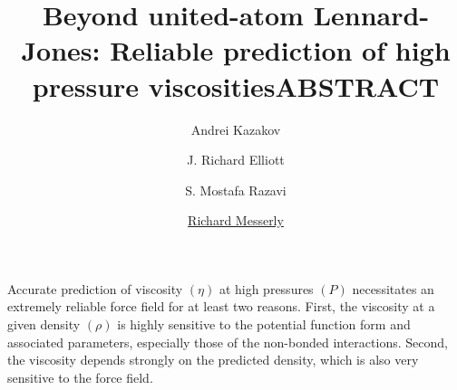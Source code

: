 \documentclass[11pt,a4paper]{article}
\begin{document}
	\thispagestyle{empty}
	\title{\Large \textbf{Beyond united-atom Lennard-Jones: Reliable prediction of high pressure viscosities}}
	\author[1]{\large {Andrei Kazakov}}
	\author[2]{\large {J. Richard Elliott}}
	\author[2]{\large {S. Mostafa Razavi}}
	\author[1]{\large {\underline{Richard Messerly}}}%

	
	
	\date{} %
	\maketitle\thispagestyle{empty} %
	\begin{center}
		\title{\textbf{ABSTRACT}}\centering{}
	\end{center}
	\justify
	
	
	
	
	
	Accurate prediction of viscosity $(\eta)$ at high pressures $(P)$ necessitates an extremely reliable force field for at least two reasons. First, the viscosity at a given density $(\rho)$ is highly sensitive to the potential function form and associated parameters, especially those of the non-bonded interactions. Second, the viscosity depends strongly on the predicted density, which is also very sensitive to the force field. 
	
\end{document}
